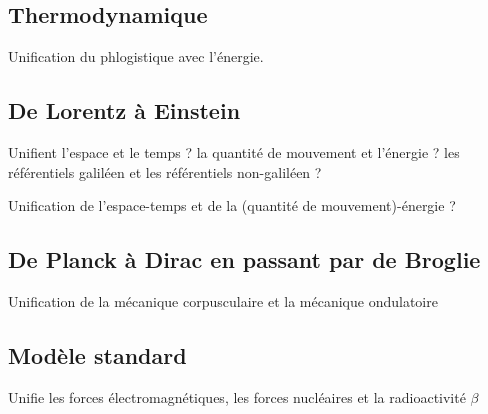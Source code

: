   \subsection{Thermodynamique}

Unification du phlogistique avec l'énergie.

  \subsection{De Lorentz à Einstein}

Unifient l'espace et le temps ? la quantité de mouvement et l'énergie ? les référentiels galiléen et les référentiels non-galiléen ?

Unification de l'espace-temps et de la (quantité de mouvement)-énergie ?

  \subsection{De Planck à Dirac en passant par de Broglie }

Unification de la mécanique corpusculaire et la mécanique ondulatoire

  \subsection{Modèle standard}

Unifie les forces électromagnétiques, les forces nucléaires et la radioactivité $\beta$





